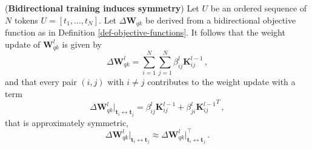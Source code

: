 \begin{theorem}
\label{theo-gradients-symmetry}
%
(\textbf{Bidirectional training induces symmetry})
%
Let $U$ be an ordered sequence of $N$ tokens $U = [t_1, \dots, t_N]$.
%
Let $\Delta \bm{W}_{qk}$ be derived from a bidirectional objective function as in Definition \ref{def-objective-functions}.
%
It follows that the weight update of $\bm{W}_{qk}^l$ is given by
%
\begin{equation}
    \Delta \bm{W}_{qk}^l = \sum_{i = 1}^N \sum_{j = 1}^N \beta^l_{ij} \bm{K}^{l-1}_{ij} \,,
\end{equation}
%
and that every pair $(i,j)$ with $i \neq j$ contributes to the weight update with a term
%
\begin{equation}
    \Delta \bm{W}_{qk}^l\big|_{\bm{t}_i \leftrightarrow \bm{t}_j} = \beta_{ij}^l\bm{K}^{l-1}_{ij} + \beta_{ji}^l{\bm{K}^{l-1}_{ij}}^T \,,
\end{equation}
%
that is approximately symmetric,
%
\begin{equation}
    \Delta \bm{W}_{qk}^l\big|_{\bm{t}_i \leftrightarrow \bm{t}_j} \approx \Delta \bm{W}_{qk}^l\big|^\top_{\bm{t}_i \leftrightarrow \bm{t}_j} \,.
\end{equation}
%
\end{theorem}